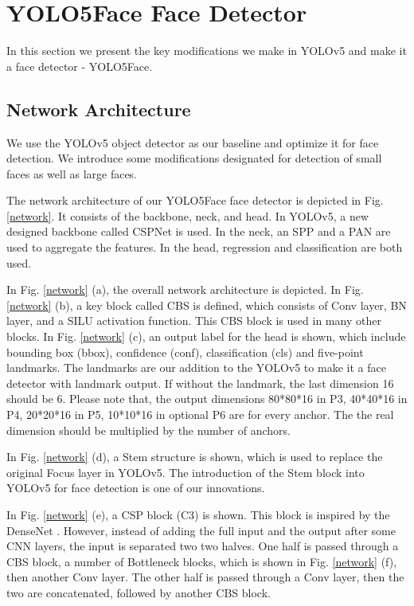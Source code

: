 \documentclass[conference]{IEEEtran}
\begin{document}
\section{YOLO5Face Face Detector}

In this section we present the key modifications we make in YOLOv5 and make it a face detector - YOLO5Face.   

\subsection{Network Architecture}

We use the YOLOv5 object detector \cite{YOLOv5} as our baseline and optimize it for face detection. We introduce some modifications designated for detection of small faces as well as large faces.  

The network architecture of our YOLO5Face face detector is depicted in Fig. \ref{network}. It consists of the backbone, neck, and head. In YOLOv5, a new designed backbone called CSPNet \cite{YOLOv5} is used. In the neck, an SPP \cite{SPP} and a PAN \cite{PAN} are used to aggregate the features.  In the head, regression and classification are both used. 

In Fig. \ref{network} (a), the overall network architecture is depicted. In Fig. \ref{network} (b), a key block called CBS is defined, which consists of Conv layer, BN layer, and a SILU \cite{SILU} activation function. This CBS block is used in many other blocks. In Fig. \ref{network} (c), an output label for the head is shown, which include bounding box (bbox), confidence (conf), classification (cls) and five-point landmarks. The landmarks are our addition to the YOLOv5 to make it a face detector with landmark output. If without the landmark, the last dimension 16 should be 6. Please note that, the output dimensions 80*80*16 in P3, 40*40*16 in P4, 20*20*16 in P5, 10*10*16 in optional P6 are for every anchor. The the real dimension should be multiplied by the number of anchors.  

In Fig. \ref{network} (d), a Stem structure \cite{Stem} is shown, which is used to replace the original Focus layer in YOLOv5. The introduction of the Stem block into YOLOv5 for face detection is one of our innovations. 

In Fig. \ref{network} (e), a CSP block (C3) is shown. This block is inspired by the DenseNet \cite{DenseNet}. However, instead of adding the full input and the output after some CNN layers, the input is separated two two halves. One half is passed through a CBS block, a number of Bottleneck blocks, which is shown in Fig. \ref{network} (f), then another Conv layer. The other half is passed through a Conv layer, then the two are concatenated, followed by another CBS block.     
\end{document}
